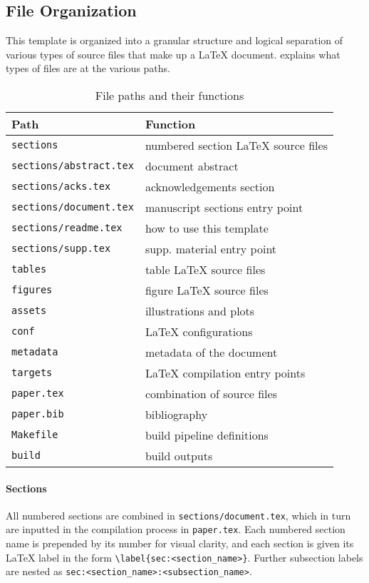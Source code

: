 \subsection{File Organization}

This template is organized into a granular structure and logical separation of various types of source files that make up a \LaTeX{} document.
 explains what types of files are at the various paths.
%
\begin{table}[ht]
    \caption{File paths and their functions}
    \label{tab:howto:path-description}
    \begin{tabular}{ll}
        \toprule
        Path & Function\\
        \midrule
        \texttt{sections} & numbered section \LaTeX{} source files\\
        \texttt{sections/abstract.tex} & document abstract\\
        \texttt{sections/acks.tex} & acknowledgements section\\
        \texttt{sections/document.tex} & manuscript sections entry point\\
        \texttt{sections/readme.tex} & how to use this template\\
        \texttt{sections/supp.tex} & supp. material entry point\\
        \texttt{tables} & table \LaTeX{} source files\\
        \texttt{figures} & figure \LaTeX{} source files\\
        \texttt{assets} & illustrations and plots\\
        \texttt{conf} & \LaTeX{} configurations\\
        \texttt{metadata} & metadata of the document\\
        \texttt{targets} & \LaTeX{} compilation entry points\\
        \texttt{paper.tex} & combination of source files\\
        \texttt{paper.bib} & bibliography\\
        \texttt{Makefile} & build pipeline definitions\\
        \texttt{build} & build outputs\\
        \bottomrule
    \end{tabular}
\end{table}

\paragraph{Sections}
All numbered sections are combined in \texttt{sections/docu\hfill\break ment.tex}, which in turn are inputted in the compilation process in \texttt{paper.tex}.
Each numbered section name is prepended by its number for visual clarity, and each section is given its \LaTeX{} label in the form \texttt{\textbackslash label\{sec:<section\_name>\}}.
Further subsection labels are nested as \texttt{sec:<section\_name>:<subsection\_name>}.

